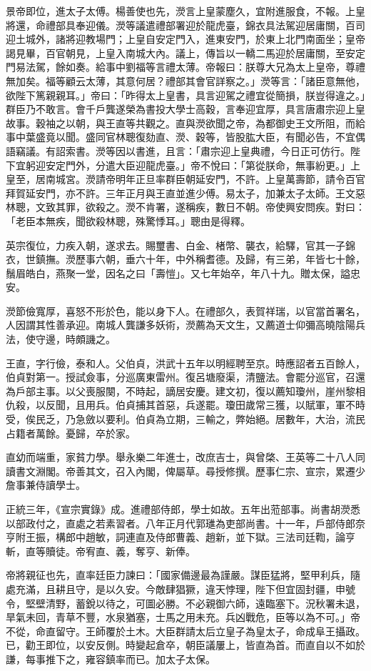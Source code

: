 \begin{pinyinscope}
景帝即位，進太子太傅。楊善使也先，濙言上皇蒙塵久，宜附進服食，不報。上皇將還，命禮部具奉迎儀。濙等議遣禮部署迎於龍虎臺，錦衣具法駕迎居庸關，百司迎土城外，諸將迎教場門；上皇自安定門入，進東安門，於東上北門南面坐；皇帝謁見畢，百官朝見，上皇入南城大內。議上，傳旨以一轎二馬迎於居庸關，至安定門易法駕，餘如奏。給事中劉福等言禮太薄。帝報曰：朕尊大兄為太上皇帝，尊禮無加矣。福等顧云太薄，其意何居？禮部其會官詳察之。」濙等言：「諸臣意無他，欲陛下篤親親耳。」帝曰：「昨得太上皇書，具言迎駕之禮宜從簡損，朕豈得違之。」群臣乃不敢言。會千戶龔遂榮為書投大學士高穀，言奉迎宜厚，具言唐肅宗迎上皇故事。穀袖之以朝，與王直等共觀之。直與濙欲聞之帝，為都御史王文所阻，而給事中葉盛竟以聞。盛同官林聰復劾直、濙、穀等，皆股肱大臣，有聞必告，不宜偶語竊議。有詔索書。濙等因以書進，且言：「肅宗迎上皇典禮，今日正可仿行。陛下宜躬迎安定門外，分遣大臣迎龍虎臺。」帝不悅曰：「第從朕命，無事紛更。」上皇至，居南城宮。濙請帝明年正旦率群臣朝延安門，不許。上皇萬壽節，請令百官拜賀延安門，亦不許。三年正月與王直並進少傅。易太子，加兼太子太師。王文惡林聰，文致其罪，欲殺之。濙不肯署，遂稱疾，數日不朝。帝使興安問疾。對曰：「老臣本無疾，聞欲殺林聰，殊驚悸耳。」聰由是得釋。

英宗復位，力疾入朝，遂求去。賜璽書、白金、楮幣、襲衣，給驛，官其一子錦衣，世鎮撫。濙歷事六朝，垂六十年，中外稱耆德。及歸，有三弟，年皆七十餘，鬚眉皓白，燕聚一堂，因名之曰「壽愷」。又七年始卒，年八十九。贈太保，謚忠安。

濙節儉寬厚，喜怒不形於色，能以身下人。在禮部久，表賀祥瑞，以官當首署名，人因謂其性善承迎。南城人龔謙多妖術，濙薦為天文生，又薦道士仰彌高曉陰陽兵法，使守邊，時頗譏之。

王直，字行儉，泰和人。父伯貞，洪武十五年以明經聘至京。時應詔者五百餘人，伯貞對第一。授試僉事，分巡廣東雷州。復呂塘廢渠，清鹽法。會罷分巡官，召還為戶部主事。以父喪服闋，不時起，謫居安慶。建文初，復以薦知瓊州，崖州黎相仇殺，以反聞，且用兵。伯貞捕其首惡，兵遂罷。瓊田歲常三獲，以賦軍，軍不時受，俟民乏，乃急斂以要利。伯貞為立期，三輸之，弊始絕。居數年，大治，流民占籍者萬餘。憂歸，卒於家。

直幼而端重，家貧力學。舉永樂二年進士，改庶吉士，與曾棨、王英等二十八人同讀書文淵閣。帝善其文，召入內閣，俾屬草。尋授修撰。歷事仁宗、宣宗，累遷少詹事兼侍讀學士。

正統三年，《宣宗實錄》成。進禮部侍郎，學士如故。五年出蒞部事。尚書胡濙悉以部政付之，直處之若素習者。八年正月代郭璡為吏部尚書。十一年，戶部侍郎奈亨附王振，構郎中趙敏，詞連直及侍郎曹義、趙新，並下獄。三法司廷鞫，論亨斬，直等贖徒。帝宥直、義，奪亨、新俸。

帝將親征也先，直率廷臣力諫曰：「國家備邊最為謹嚴。謀臣猛將，堅甲利兵，隨處充滿，且耕且守，是以久安。今敵肆猖獗，違天悖理，陛下但宜固封疆，申號令，堅壁清野，蓄銳以待之，可圖必勝。不必親御六師，遠臨塞下。況秋署未退，旱氣未回，青草不豐，水泉猶塞，士馬之用未充。兵凶戰危，臣等以為不可。」帝不從，命直留守。王師覆於土木。大臣群請太后立皇子為皇太子，命成阜王攝政。已，勸王即位，以安反側。時變起倉卒，朝臣議屢上，皆直為首。而直自以不如於謙，每事推下之，雍容鎮率而已。加太子太保。


\end{pinyinscope}
